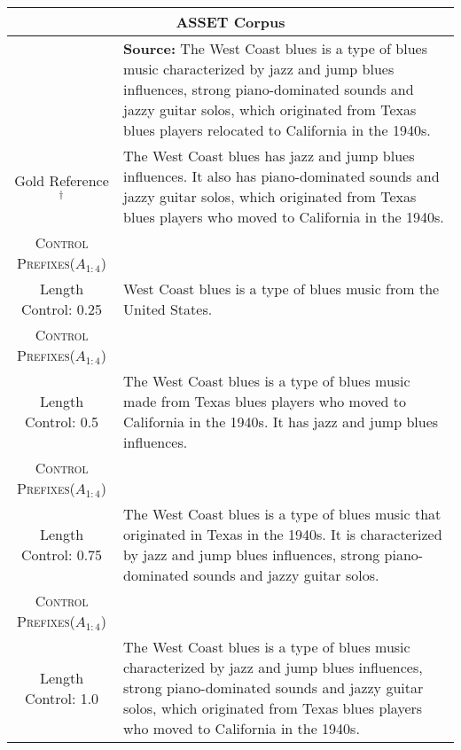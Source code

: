 \documentclass[11pt]{article}
\newcommand{\control}{\textsc{Control Prefixes}\xspace}
\newcommand{\rd}[1]{{\color{red}  #1}}
\begin{document}
\begin{table*}[bth!]
\scriptsize
  \centering
  \renewcommand{\arraystretch}{1.3}
  \begin{tabular}{c|p{}}
  \hline
 
  \multicolumn{2}{c}{\textbf{ASSET Corpus}} \\ \hline
 & \textbf{Source:} The West Coast blues is a type of blues music characterized by jazz and jump blues influences, strong piano-dominated sounds and jazzy guitar solos, which originated from Texas blues players relocated to California in the 1940s. \\ \hline

  
Gold Reference$^\dagger$
& The West Coast blues has jazz and jump blues influences. It also has piano-dominated sounds and jazzy guitar solos, which originated from Texas blues players who moved to California in the 1940s. \\ \hline
\control  ($A_{1:4}$)\\Length Control: \rd{0.25}
& West Coast blues is a type of blues music from the United States.\\ \hline
\control  ($A_{1:4}$)\\Length Control: \rd{0.5}
& The West Coast blues is a type of blues music made from Texas blues players who moved to California in the 1940s. It has jazz and jump blues influences.\\ \hline
\control  ($A_{1:4}$)\\Length Control: \rd{0.75}
& The West Coast blues is a type of blues music that originated in Texas in the 1940s. It is characterized by jazz and jump blues influences, strong piano-dominated sounds and jazzy guitar solos.\\ \hline
\control  ($A_{1:4}$)\\Length Control: \rd{1.0}
& The West Coast blues is a type of blues music characterized by jazz and jump blues influences, strong piano-dominated sounds and jazzy guitar solos, which originated from Texas blues players who moved to California in the 1940s. 
\\ \midrule \hline




  \end{tabular}
  \caption{\textbf{Controlled text simplification}: a qualitative example from the ASSET Corpus validation set, with our corresponding \control model outputs. Only the control prefix for the length control ratio is varied, depicted in \rd{red}. $^\dagger$Note, this is one random gold reference out of 10.}
  \label{tab:controlled_simp}
\end{table*}
\end{document}
